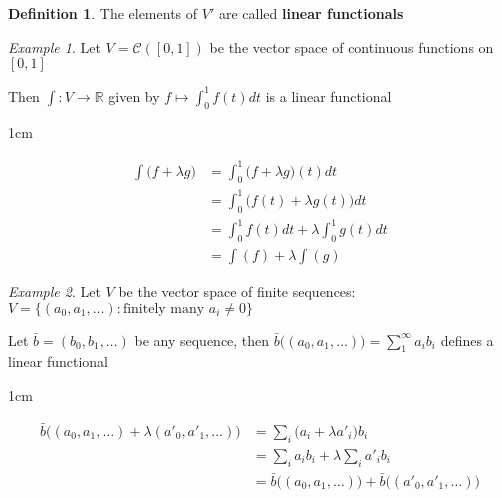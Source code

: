 \documentclass[11pt, a4paper]{report}
\makeatletter
\numberwithin{equation}{section}
\newcommand{\R}{\mathbb{R}}
\newcommand{\tint}{\textstyle{\int}}
\numberwithin{equation}{subsection}
\theoremstyle{plain}
\theoremstyle{definition}
\newtheorem{defn}{Definition}[chapter]
\theoremstyle{remark}
\newtheorem{exmp}{Example}[chapter]
\newtheorem*{prf}{Proof}
\renewenvironment{prf}[1][\proofname]{\par
  \vspace{-\topsep}%
  \normalfont
  \topsep0pt \partopsep0pt %
  \trivlist
  \item[\hskip\labelsep
        \itshape
    #1\@addpunct{.}]\ignorespaces
}{%
  \popQED\endtrivlist\@endpefalse
  \addvspace{6pt plus 6pt} %
}
\newcommand{\pr}[1]{\begin{adjustwidth}{1cm}{} \begin{prf} #1 \end{prf} \end{adjustwidth}}
\makeatother
\begin{document}
\begin{defn}
The elements of $V'$ are called \textbf{linear functionals}
\end{defn}

\begin{exmp}
Let $V = \mathcal{C}([0,1])$ be the vector space of continuous functions on $[0,1]$

Then $\int: V \to \R$ given by $f \mapsto \int_0^1 f(t) dt$ is a linear functional
\pr{
\begin{align*}
\tint \big( f + \lambda g \big) &= \int_0^1 \big( f + \lambda g \big) (t) dt \\
					&= \int_0^1 \big( f(t) + \lambda g(t) \big) dt \\
					&= \int_0^1 f(t) dt + \lambda \int_0^1 g(t) dt \\
					&= \tint(f) + \lambda \tint(g)
\end{align*}
}
\end{exmp}

\begin{exmp}
Let $V$ be the vector space of finite sequences: $V = \{ (a_0, a_1, \ldots) : \text{finitely many } a_i \neq 0 \}$

Let $\bar{b} = (b_0, b_1, \ldots)$ be any sequence, then $\bar{b} \big( (a_0, a_1, \ldots) \big) = \sum_1^\infty a_ib_i$ defines a linear functional
\pr{
\begin{align*}
\bar{b} \big( (a_0, a_1, \ldots) + \lambda(a'_0, a'_1, \ldots) \big)
	&= \sum_i \big( a_i + \lambda a'_i \big) b_i \\
	&= \sum_i a_i b_i + \lambda \sum_i a'_i b_i \\
	&= \bar{b} \big( (a_0, a_1, \ldots) \big) + \bar{b} \big( (a'_0, a'_1, \ldots) \big)
\end{align*}
}
\end{exmp}

\newpage
\end{document}
